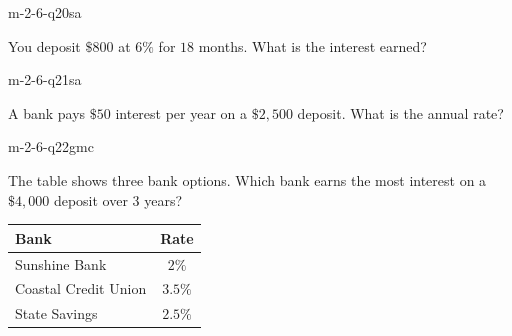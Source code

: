 \begin{practiceQuestion}{m-2-6-q20}{sa}
\begin{questionText}
You deposit $\$800$ at $6\%$ for $18$ months. What is the interest earned?
\end{questionText}
\end{practiceQuestion}

\begin{practiceQuestion}{m-2-6-q21}{sa}
\begin{questionText}
A bank pays $\$50$ interest per year on a $\$2{,}500$ deposit. What is the annual rate?
\end{questionText}
\end{practiceQuestion}


\begin{practiceQuestion}{m-2-6-q22}{gmc}
\begin{questionText}
The table shows three bank options. Which bank earns the most interest on a $\$4{,}000$ deposit over $3$ years?

\begin{center}
\begin{tabular}{|l|c|}
\hline
\textbf{Bank} & \textbf{Rate} \\
\hline
Sunshine Bank & $2\%$ \\
\hline
Coastal Credit Union & $3.5\%$ \\
\hline
State Savings & $2.5\%$ \\
\hline
\end{tabular}
\end{center}
\end{questionText}
\end{practiceQuestion}

